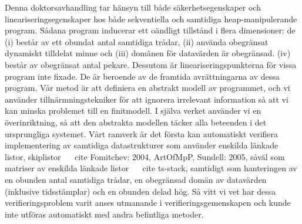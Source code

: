 Denna doktorsavhandling tar hänsyn till både säkerhetsegenskaper och lineariseringsegenskaper hos
både sekventiella och samtidiga heap-manipulerande program.
Sådana program inducerar ett oändligt tillstånd i flera dimensioner:
de %
(i) består av ett obundat antal samtidiga trådar,%
(ii) använda obegränsat dynamiskt tilldelat minne och%
(iii) domänen för datavärden är obegränsad. %
(iv) består av obegränsat antal pekare.
Dessutom är lineariseringspunkterna för vissa program inte fixade. De är beroende av de framtida avrättningarna av dessa program.
Vår metod är att definiera en abstrakt modell av programmet, och vi använder tillnärmningstekniker för att ignorera irrelevant information så att vi kan minska problemet till en finitmodell. I själva verket använder vi en överinriktning, så att den abstrakta modellen täcker alla beteenden i det ursprungliga systemet. Vårt ramverk är det första
kan automatiskt verifiera implementering av samtidiga datastrukturer som använder
enskilda länkade listor, skiplistor ~ \ cite {Fomitchev: 2004, ArtOfMpP, Sundell: 2005},
såväl som matriser av enskilda länkade listor ~ \ cite {ts-stack},
samtidigt som hanteringen av en obunden
antal samtidiga trådar, en obegränsad domän av datavärden
(inklusive tidsstämplar) och en obunden delad hög. Så vitt vi vet har dessa verifieringsproblem varit
anses utmanande i verifieringsgemenskapen och
kunde inte utföras automatiskt med andra befintliga metoder.






